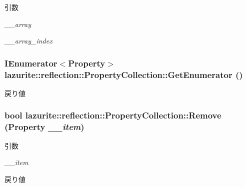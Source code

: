 \begin{DoxyParams}{引数}
\item[{\em \_\-\_\-array}]\item[{\em \_\-\_\-array\_\-index}]\end{DoxyParams}
\hypertarget{classlazurite_1_1reflection_1_1_property_collection_aa7a45429917cca9bcab939b275138831}{
\subsubsection[{GetEnumerator}]{\setlength{\rightskip}{0pt plus 5cm}IEnumerator$<${\bf Property}$>$ lazurite::reflection::PropertyCollection::GetEnumerator ()}}
\label{classlazurite_1_1reflection_1_1_property_collection_aa7a45429917cca9bcab939b275138831}
\begin{DoxyReturn}{戻り値}

\end{DoxyReturn}
\hypertarget{classlazurite_1_1reflection_1_1_property_collection_aa0448533496f20b5567079b84e8d6094}{
\subsubsection[{Remove}]{\setlength{\rightskip}{0pt plus 5cm}bool lazurite::reflection::PropertyCollection::Remove ({\bf Property} {\em \_\-\_\-item})}}
\label{classlazurite_1_1reflection_1_1_property_collection_aa0448533496f20b5567079b84e8d6094}

\begin{DoxyParams}{引数}
\item[{\em \_\-\_\-item}]\end{DoxyParams}
\begin{DoxyReturn}{戻り値}

\end{DoxyReturn}


